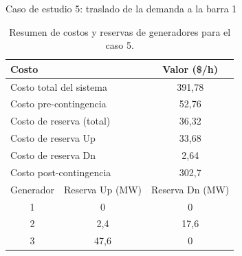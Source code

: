 \begin{frame}{Caso de estudio 5: traslado de la demanda a la barra 1}
\small
\begin{table}[H]
    \renewcommand{\arraystretch}{1.3}
    \centering
    \caption{Resumen de costos y reservas de generadores para el caso 5.}
    \label{tab:res_ctos_caso5}
    \begin{tabular}{|c|c|c|}
		\hline
		\multicolumn{2}{|l|}{Costo} & Valor (\$/h) \\
		\hline
		\multicolumn{2}{|l|}{Costo total del sistema} & 391,78 \\
		\multicolumn{2}{|l|}{Costo pre-contingencia} & 52,76 \\
		\multicolumn{2}{|l|}{Costo de reserva (total)} & 36,32 \\
		\multicolumn{2}{|l|}{Costo de reserva Up} & 33,68 \\
		\multicolumn{2}{|l|}{Costo de reserva Dn} & 2,64 \\
		\multicolumn{2}{|l|}{Costo post-contingencia} & 302,7 \\
		\hline \hline
		Generador & Reserva Up (MW) & Reserva Dn (MW) \\
		\hline
		1 & 0 & 0 \\
		2 & 2,4 & 17,6 \\
		3 & 47,6 & 0 \\
		\hline
	\end{tabular}
	\end{table}
\end{frame}
